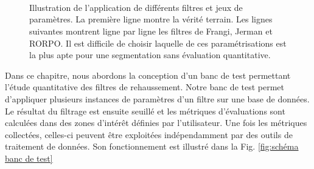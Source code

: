 \begin{figure}[!ht]
  \centering
\\
  \\
  \\
  \caption{Illustration de l'application de différents filtres et jeux de paramètres. La première ligne montre la vérité terrain. Les lignes suivantes montrent ligne par ligne les filtres de Frangi, Jerman et RORPO. Il est difficile de choisir laquelle de ces paramétrisations est la plus apte pour une segmentation sans évaluation quantitative.}
  \label{fig:problematics}
\end{figure}

Dans ce chapitre, nous abordons la conception d'un banc de test permettant l'étude quantitative des filtres de rehaussement. Notre banc de test permet d'appliquer plusieurs instances de paramètres d'un filtre sur une base de données. Le résultat du filtrage est ensuite seuillé et les métriques d'évaluations sont calculées dans des zones d'intérêt définies par l'utilisateur. Une fois les métriques collectées, celles-ci peuvent être exploitées indépendamment par des outils de traitement de données. Son fonctionnement est illustré dans la Fig. \ref{fig:schéma banc de test}

